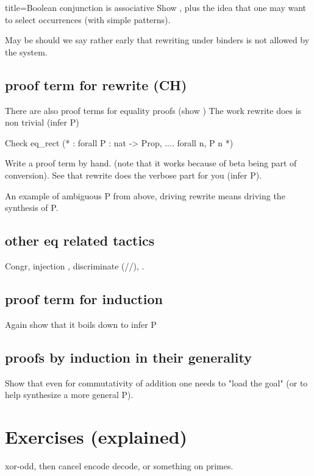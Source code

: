 \begin{coq}{title=Boolean conjunction is associative}
Show , plus the idea that one may want to select
occurrences (with simple patterns).


May be should we say rather early that rewriting under binders is not
allowed by the system.

\subsection{proof term for rewrite (CH)}

There are also proof terms for equality proofs (show )
The work rewrite does is non trivial (infer P)

\begin{coq}{}
Check eq_rect (* : forall P : nat -> Prop, .... forall n, P n *)
\end{coq}

Write a proof term by hand.
(note that it works because of beta being part of conversion).
See that rewrite does the verbose part for you (infer P).

An example of ambiguous P from above, driving rewrite means driving the
synthesis of P.

\subsection{other eq related tactics}

Congr, injection \C{[= ]}, discriminate (//), \C{->}.


\subsection{proof term for induction}

Again show that it boils down to infer P


\subsection{proofs by induction in their generality}

Show that even for commutativity of addition one needs to
"load the goal" (or to help synthesize a more general P).


\section{Exercises (explained)}

xor-odd, then cancel encode decode, or something on primes.


\end{coq}
